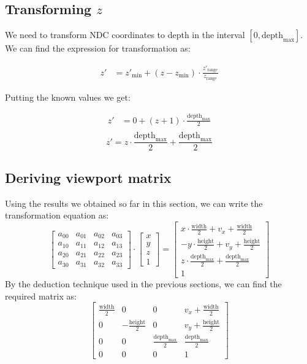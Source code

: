 \subsection{Transforming \( z \)}

We need to transform NDC coordinates to depth in the interval \([0,\text{depth}_{\max}]\).  
We can find the expression for transformation as:

\begin{align*}
z' &= z'_{\min} + (z - z_{\min}) \cdot \frac{z'_{\text{range}}}{z_{\text{range}}}
\end{align*}

Putting the known values we get:

\begin{align*}
z' &= 0 + (z + 1) \cdot \frac{\text{depth}_{\max}}{2} \\
\end{align*}
\begin{equation}
       z' = z \cdot \frac{\text{depth}_{\max}}{2} + \frac{\text{depth}_{\max}}{2}
\end{equation}
\subsection{Deriving viewport matrix}
Using the results we obtained so far in this section, we can write the transformation equation as:
\[
\begin{bmatrix}
a_{00} & a_{01} & a_{02} & a_{03} \\
a_{10} & a_{11} & a_{12} & a_{13} \\
a_{20} & a_{21} & a_{22} & a_{23} \\
a_{30} & a_{31} & a_{32} & a_{33}
\end{bmatrix}
\cdot
\begin{bmatrix}
x \\
y \\
z \\
1
\end{bmatrix}
=
\begin{bmatrix}
x \cdot \frac{\text{width}}{2} + v_x + \frac{\text{width}}{2}  \\
- y \cdot \frac{\text{height}}{2} + v_y + \frac{\text{height}}{2} \\
z \cdot \frac{\text{depth}_{\max}}{2} + \frac{\text{depth}_{\max}}{2} \\
1
\end{bmatrix}
\]
By the deduction technique used in the previous sections, we can find the required matrix as:
\begin{equation}
\begin{bmatrix}
\frac{\text{width}}{2} & 0 & 0 & v_x + \frac{\text{width}}{2} \\
0 & -\frac{\text{height}}{2} & 0 & v_y + \frac{\text{height}}{2} \\
0 & 0 & \frac{\text{depth}_{\max}}{2} & \frac{\text{depth}_{\max}}{2} \\
0 & 0 & 0 & 1
\end{bmatrix}
\end{equation}
